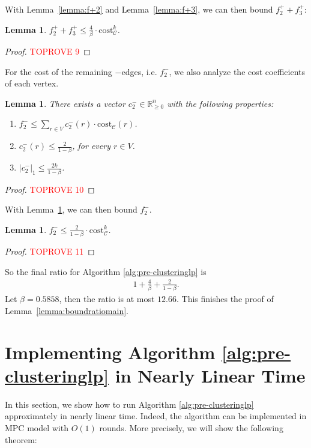 \documentclass[11pt]{article}
\newcommand{\R}{\mathbb{R}}
\newcommand{\cost}{\mathrm{cost}}
\newtheorem{lemma}[theorem]{Lemma}
\newcommand{\calC}{{\mathcal{C}}}
\begin{document}
\begin{CJK*}{UTF8}{gbsn}
With Lemma~\ref{lemma:f+2} and Lemma~\ref{lemma:f+3}, we can then bound $f^+_2 + f^+_3$: 
\begin{lemma}
    $f^+_2 + f^+_3 \leq \frac4\beta \cdot \cost^k_\calC$. 
\end{lemma}
\begin{proof}\textcolor{red}{TOPROVE 9}\end{proof}

For the cost of the remaining $-$edges, i.e. $f^-_2$, we also analyze the cost coefficients of each vertex.

\begin{lemma}
    \label{lemma:f-2-properties}
    There exists a vector $c^-_2 \in \R_{\geq 0}^{n}$ with the following properties:
    \begin{enumerate}[label=(\ref{lemma:f-2-properties}\alph*)]
        \item \label{property:f-2-cost} $f^-_2 \leq \sum_{r \in V}c^-_2(r)\cdot \cost_\calC(r)$.
        \item \label{property:f-2-c-2-infty} $c^-_2(r) \leq \frac{2}{1-\beta}$, for every $r \in V$.
        \item \label{property:f-2-c-2-1} $|c^-_2|_1 \leq \frac{2k}{1-\beta}$.
    \end{enumerate}
\end{lemma}
\begin{proof}\textcolor{red}{TOPROVE 10}\end{proof}

With Lemma~\ref{lemma:f-2-properties}, we can then bound $f^-_2$.

\begin{lemma}
    $f^-_2 \leq \frac{2}{1-\beta} \cdot \cost^k_\calC$.
\end{lemma}
\begin{proof}\textcolor{red}{TOPROVE 11}\end{proof}

So the final ratio for Algorithm \ref{alg:pre-clusteringlp} is 
\begin{align*}
1 + \frac4\beta + \frac2{1-\beta}.
\end{align*} 
Let $\beta = 0.5858$, then the ratio is at most $12.66$.  This finishes the proof of Lemma~\ref{lemma:boundratiomain}.





 
\section{Implementing Algorithm \ref{alg:pre-clusteringlp} in Nearly Linear Time}
\label{sec:nearly-linear}
In this section, we show how to run Algorithm \ref{alg:pre-clusteringlp} approximately in nearly linear time. Indeed, the algorithm can be implemented in MPC model with $O(1)$ rounds. More precisely, we will show the following theorem:


\end{CJK*}
\end{document}
